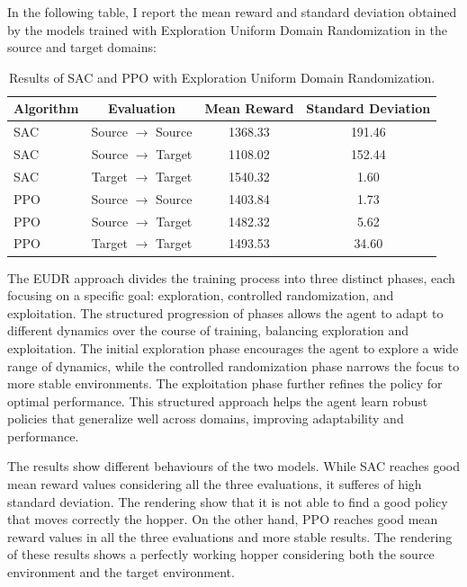 \documentclass[12pt]{article}
\begin{document}
In the following table, I report the mean reward and standard deviation obtained by the models trained with Exploration Uniform Domain Randomization in the source and target domains:

\begin{table}[H]
    \centering
    \begin{tabular}{|l|c|c|c|}
        \hline
        \textbf{Algorithm} & \textbf{Evaluation} & \textbf{Mean Reward} & \textbf{Standard Deviation} \\ \hline
        SAC & Source $\rightarrow$ Source & 1368.33 & 191.46 \\ 
        SAC & Source $\rightarrow$ Target & 1108.02 & 152.44 \\ 
        SAC & Target $\rightarrow$ Target & 1540.32 & 1.60 \\ \hline
        PPO & Source $\rightarrow$ Source & 1403.84 & 1.73 \\ 
        PPO & Source $\rightarrow$ Target & 1482.32 & 5.62 \\ 
        PPO & Target $\rightarrow$ Target & 1493.53 & 34.60 \\ \hline
    \end{tabular}
    \caption{Results of SAC and PPO with Exploration Uniform Domain Randomization.}
    \label{tab:results_eudr}
\end{table}

The EUDR approach divides the training process into three distinct phases, each focusing on a specific goal: exploration, controlled randomization, and exploitation. The structured progression of phases allows the agent to adapt to different dynamics over the course of training, balancing exploration and exploitation. The initial exploration phase encourages the agent to explore a wide range of dynamics, while the controlled randomization phase narrows the focus to more stable environments. The exploitation phase further refines the policy for optimal performance. This structured approach helps the agent learn robust policies that generalize well across domains, improving adaptability and performance.

The results show different behaviours of the two models. While SAC reaches good mean reward values considering all the three evaluations, it sufferes of high standard deviation. The rendering show that it is not able to find a good policy that moves correctly the hopper. On the other hand, PPO reaches good mean reward values in all the three evaluations and more stable results. The rendering of these results shows a perfectly working hopper considering both the source environment and the target environment. 
\end{document}
